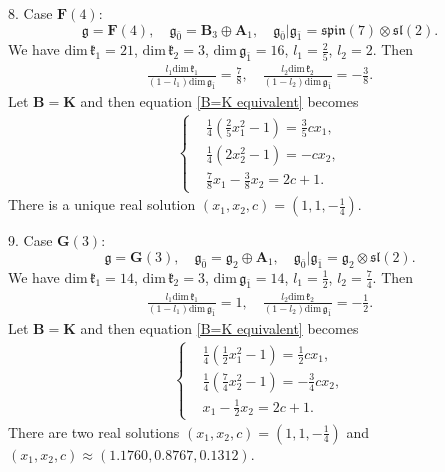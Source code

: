 \documentclass[reqno]{amsart}
\theoremstyle{definition}
\begin{document}
8. Case $\mathbf{F}(4)$:
$$\mathfrak{g}=\mathbf{F}(4),\quad
\mathfrak{g}_{\bar{0}}=\mathbf{B}_{3}\oplus \mathbf{A}_{1},\quad \mathfrak{g}_{\bar{0}}|\mathfrak{g}_{\bar{1}}=\mathfrak{spin}(7)\otimes\mathfrak{sl}(2).$$
We have $\mathrm{dim}\,\mathfrak{k}_{1}=21$, $\mathrm{dim}\,\mathfrak{k}_{2}=3$, $\mathrm{dim}\,\mathfrak{g}_{\bar{1}}=16$, $l_{1}=\frac{2}{5}$, $l_{2}=2$. Then
\begin{eqnarray*}
\frac{l_{1}\mathrm{dim}\,\mathfrak{k}_{1}}{(1-l_{1})\mathrm{dim}\,\mathfrak{g}_{\bar{1}}}=\frac{7}{8},\quad
\frac{l_{2}\mathrm{dim}\,\mathfrak{k}_{2}}{(1-l_{2})\mathrm{dim}\,\mathfrak{g}_{\bar{1}}}=-\frac{3}{8}.
\end{eqnarray*}
Let $\mathbf{B}=\mathbf{K}$ and then equation \eqref{B=K equivalent} becomes
\begin{eqnarray*}
\left\{
\begin{aligned}
&\frac{1}{4}\left(\frac{2}{5}x_{1}^{2}-1\right)=\frac{3}{5}c x_{1},\\
&\frac{1}{4}(2 x_{2}^{2}-1)=-c x_{2},\\
&\frac{7}{8}x_{1}-\frac{3}{8}x_{2}=2c+1.
\end{aligned}\right.
\end{eqnarray*}
There is a unique real solution $(x_{1},x_{2},c)=\left(1,1,-\frac{1}{4}\right)$.


9. Case $\mathbf{G}(3)$:
$$\mathfrak{g}=\mathbf{G}(3),\quad
\mathfrak{g}_{\bar{0}}=\mathfrak{g}_{2}\oplus \mathbf{A}_{1},\quad
\mathfrak{g}_{\bar{0}}|\mathfrak{g}_{\bar{1}}=\mathfrak{g}_{2}\otimes\mathfrak{sl}(2).$$
We have  $\mathrm{dim}\,\mathfrak{k}_{1}=14$, $\mathrm{dim}\,\mathfrak{k}_{2}=3$, $\mathrm{dim}\,\mathfrak{g}_{\bar{1}}=14$, $l_{1}=\frac{1}{2}$, $l_{2}=\frac{7}{4}$. Then
\begin{eqnarray*}
\frac{l_{1}\mathrm{dim}\,\mathfrak{k}_{1}}{(1-l_{1})\mathrm{dim}\,\mathfrak{g}_{\bar{1}}}=1,\quad
\frac{l_{2}\mathrm{dim}\,\mathfrak{k}_{2}}{(1-l_{2})\mathrm{dim}\,\mathfrak{g}_{\bar{1}}}=-\frac{1}{2}.
\end{eqnarray*}
Let $\mathbf{B}=\mathbf{K}$ and then equation \eqref{B=K equivalent} becomes
\begin{eqnarray*}
\left\{
\begin{aligned}
&\frac{1}{4}\left(\frac{1}{2}x_{1}^{2}-1\right)=\frac{1}{2}c x_{1},\\
&\frac{1}{4}\left(\frac{7}{4} x_{2}^{2}-1\right)=-\frac{3}{4}c x_{2},\\
&x_{1}-\frac{1}{2}x_{2}=2c+1.
\end{aligned}\right.
\end{eqnarray*}
There are two real solutions $(x_{1},x_{2},c)=(1,1,-\frac{1}{4})$ and
 $(x_{1},x_{2},c)\approx (1.1760,0.8767,0.1312).$
\end{document}
